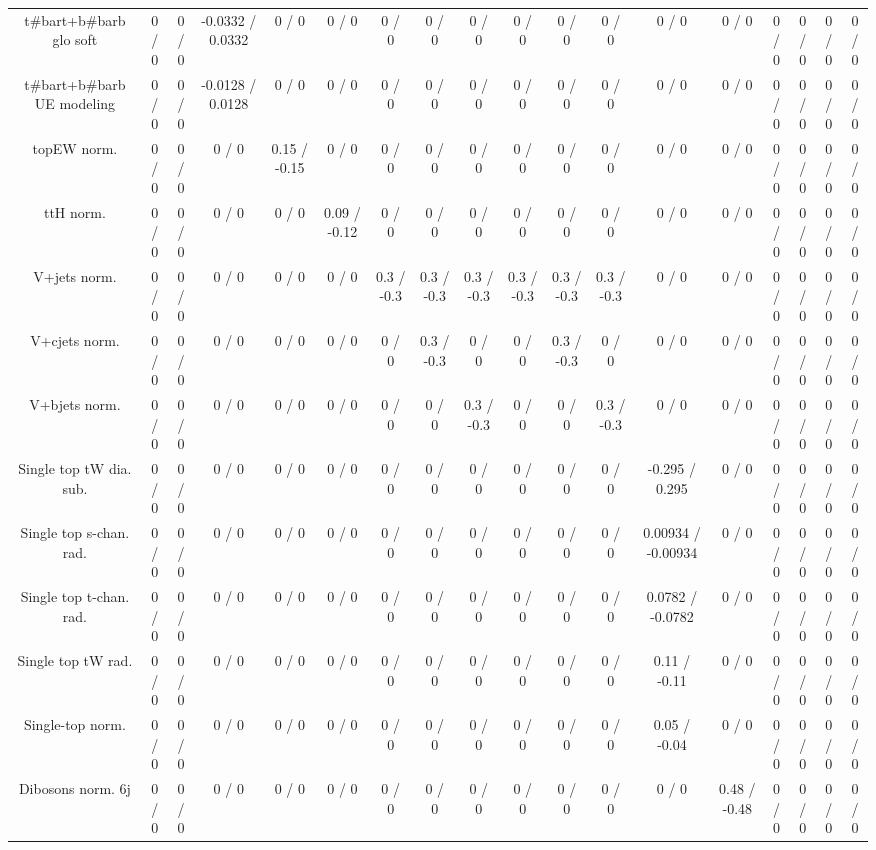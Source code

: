 \documentclass[10pt]{article}
\begin{document}
\begin{table}[htbp]
\begin{center}
\begin{tabular}{|c|c|c|c|c|c|c|c|c|c|c|c|c|c|c|c|c|c|}
  t#bar{t}+b#bar{b} glo soft & 0 / 0 & 0 / 0 & -0.0332 / 0.0332 & 0 / 0 & 0 / 0 & 0 / 0 & 0 / 0 & 0 / 0 & 0 / 0 & 0 / 0 & 0 / 0 & 0 / 0 & 0 / 0 & 0 / 0 & 0 / 0 & 0 / 0 & 0 / 0 \\ 
  t#bar{t}+b#bar{b} UE modeling & 0 / 0 & 0 / 0 & -0.0128 / 0.0128 & 0 / 0 & 0 / 0 & 0 / 0 & 0 / 0 & 0 / 0 & 0 / 0 & 0 / 0 & 0 / 0 & 0 / 0 & 0 / 0 & 0 / 0 & 0 / 0 & 0 / 0 & 0 / 0 \\ 
  topEW norm. & 0 / 0 & 0 / 0 & 0 / 0 & 0.15 / -0.15 & 0 / 0 & 0 / 0 & 0 / 0 & 0 / 0 & 0 / 0 & 0 / 0 & 0 / 0 & 0 / 0 & 0 / 0 & 0 / 0 & 0 / 0 & 0 / 0 & 0 / 0 \\ 
  ttH norm. & 0 / 0 & 0 / 0 & 0 / 0 & 0 / 0 & 0.09 / -0.12 & 0 / 0 & 0 / 0 & 0 / 0 & 0 / 0 & 0 / 0 & 0 / 0 & 0 / 0 & 0 / 0 & 0 / 0 & 0 / 0 & 0 / 0 & 0 / 0 \\ 
  V+jets norm. & 0 / 0 & 0 / 0 & 0 / 0 & 0 / 0 & 0 / 0 & 0.3 / -0.3 & 0.3 / -0.3 & 0.3 / -0.3 & 0.3 / -0.3 & 0.3 / -0.3 & 0.3 / -0.3 & 0 / 0 & 0 / 0 & 0 / 0 & 0 / 0 & 0 / 0 & 0 / 0 \\ 
  V+cjets norm. & 0 / 0 & 0 / 0 & 0 / 0 & 0 / 0 & 0 / 0 & 0 / 0 & 0.3 / -0.3 & 0 / 0 & 0 / 0 & 0.3 / -0.3 & 0 / 0 & 0 / 0 & 0 / 0 & 0 / 0 & 0 / 0 & 0 / 0 & 0 / 0 \\ 
  V+bjets norm. & 0 / 0 & 0 / 0 & 0 / 0 & 0 / 0 & 0 / 0 & 0 / 0 & 0 / 0 & 0.3 / -0.3 & 0 / 0 & 0 / 0 & 0.3 / -0.3 & 0 / 0 & 0 / 0 & 0 / 0 & 0 / 0 & 0 / 0 & 0 / 0 \\ 
  Single top tW dia. sub. & 0 / 0 & 0 / 0 & 0 / 0 & 0 / 0 & 0 / 0 & 0 / 0 & 0 / 0 & 0 / 0 & 0 / 0 & 0 / 0 & 0 / 0 & -0.295 / 0.295 & 0 / 0 & 0 / 0 & 0 / 0 & 0 / 0 & 0 / 0 \\ 
  Single top s-chan. rad. & 0 / 0 & 0 / 0 & 0 / 0 & 0 / 0 & 0 / 0 & 0 / 0 & 0 / 0 & 0 / 0 & 0 / 0 & 0 / 0 & 0 / 0 & 0.00934 / -0.00934 & 0 / 0 & 0 / 0 & 0 / 0 & 0 / 0 & 0 / 0 \\ 
  Single top t-chan. rad. & 0 / 0 & 0 / 0 & 0 / 0 & 0 / 0 & 0 / 0 & 0 / 0 & 0 / 0 & 0 / 0 & 0 / 0 & 0 / 0 & 0 / 0 & 0.0782 / -0.0782 & 0 / 0 & 0 / 0 & 0 / 0 & 0 / 0 & 0 / 0 \\ 
  Single top tW rad. & 0 / 0 & 0 / 0 & 0 / 0 & 0 / 0 & 0 / 0 & 0 / 0 & 0 / 0 & 0 / 0 & 0 / 0 & 0 / 0 & 0 / 0 & 0.11 / -0.11 & 0 / 0 & 0 / 0 & 0 / 0 & 0 / 0 & 0 / 0 \\ 
  Single-top norm. & 0 / 0 & 0 / 0 & 0 / 0 & 0 / 0 & 0 / 0 & 0 / 0 & 0 / 0 & 0 / 0 & 0 / 0 & 0 / 0 & 0 / 0 & 0.05 / -0.04 & 0 / 0 & 0 / 0 & 0 / 0 & 0 / 0 & 0 / 0 \\ 
  Dibosons norm. 6j & 0 / 0 & 0 / 0 & 0 / 0 & 0 / 0 & 0 / 0 & 0 / 0 & 0 / 0 & 0 / 0 & 0 / 0 & 0 / 0 & 0 / 0 & 0 / 0 & 0.48 / -0.48 & 0 / 0 & 0 / 0 & 0 / 0 & 0 / 0 \\ 

\end{tabular}
\end{center}
\end{table}
\end{document}
